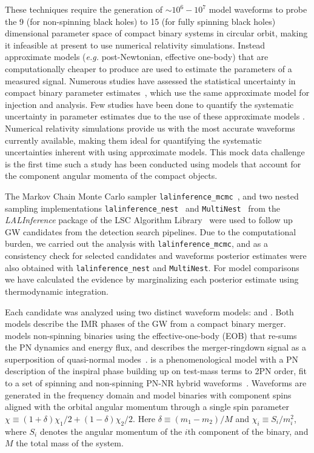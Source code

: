 These techniques require the generation of $\sim 10^6 - 10^7$ model waveforms
to probe the 9 (for non-spinning black holes) to 15 (for fully spinning black
holes) dimensional parameter space of compact binary systems in circular orbit,
making it infeasible at present to use numerical relativity simulations.
Instead approximate models (\textit{e.g.} post-Newtonian, effective one-body)
that are computationally cheaper to produce are used to estimate the parameters
of a measured signal. Numerous studies have assessed the statistical
uncertainty in compact binary parameter
estimates~\cite{vanderSluys:2009bf,Raymond:2008im,Veitch:2009hd,   
Raymond:2009cv}, which use the same approximate model for injection and
analysis. Few studies have been done to quantify the systematic uncertainty in
parameter estimates due to the use of these approximate models
\cite{Canitrot:2001hc,Cutler:2007mi}. Numerical relativity simulations
provide us with the most accurate waveforms currently available, making them
ideal for quantifying the systematic uncertainties inherent with using
approximate models.  This mock data challenge is the first time such a study
has been conducted using models that account for the component angular momenta
of the compact objects.

The Markov Chain Monte Carlo sampler
\texttt{lalinference\_mcmc}~\cite{vanderSluys:2007st,vanderSluys:2008qx}, and
two nested sampling implementations
\texttt{lalinference\_nest}~\cite{Veitch:2009hd} and
\texttt{MultiNest}~\cite{Feroz:2008xx} from the \textit{LALInference} package
of the LSC Algorithm Library~\cite{LAL} were used to follow up GW candidates
from the detection search pipelines. Due to the computational burden, we carried
out the analysis with \texttt{lalinference\_mcmc}, and as a consistency check
for selected candidates and waveforms posterior estimates were also obtained
with \texttt{lalinference\_nest} and \texttt{MultiNest}. For model comparisons
we have calculated the evidence by marginalizing each posterior estimate using
thermodynamic integration.

Each candidate was analyzed using two distinct waveform models: \imr and
\eob.  Both models describe the IMR phases of the GW from a compact binary 
merger.  \eob models
non-spinning binaries using the effective-one-body (EOB) 
that re-sums the PN dynamics and energy flux, and describes 
the merger-ringdown signal as a superposition of 
quasi-normal modes~\cite{Pan:2011gk}. \imr is a
phenomenological model with a PN description of the inspiral phase
building up on test-mass terms to 2PN order, fit to a set of spinning and 
non-spinning PN-NR hybrid waveforms~\cite{Ajith:2009bn}.  Waveforms are 
generated in the frequency
domain and model binaries with component spins aligned with the orbital
angular momentum through a single spin parameter $\chi \equiv
(1+\delta)\chi_1/2 + (1-\delta)\chi_2/2$. Here $\delta \equiv (m_1-m_2)/M$ and
$\chi_i\equiv S_i/m_i^2$, where $S_i$ denotes the angular momentum of the $i$th
component of the binary, and $M$ the total mass of the system. 

